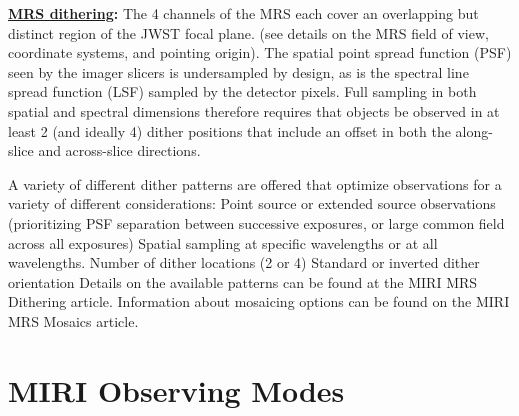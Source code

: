 \smallskip \smallskip
\noindent
{\bf \underline{MRS dithering}:} 
The 4 channels of the MRS each cover an overlapping but distinct
region of the JWST focal plane. (see details on the MRS field of view,
coordinate systems, and pointing origin).  The spatial point spread
function (PSF) seen by the imager slicers is undersampled by design,
as is the spectral line spread function (LSF) sampled by the detector
pixels.  Full sampling in both spatial and spectral dimensions
therefore requires that objects be observed in at least 2 (and ideally
4) dither positions that include an offset in both the along-slice and
across-slice directions.

A variety of different dither patterns are
offered that optimize observations for a variety of different
considerations: Point source or extended source observations
(prioritizing PSF separation between successive exposures, or large
common field across all exposures) Spatial sampling at specific
wavelengths or at all wavelengths.  Number of dither locations (2 or
4) Standard or inverted dither orientation Details on the available
patterns can be found at the MIRI MRS Dithering article.  Information
about mosaicing options can be found on the MIRI MRS Mosaics article.


\section{MIRI Observing Modes}
